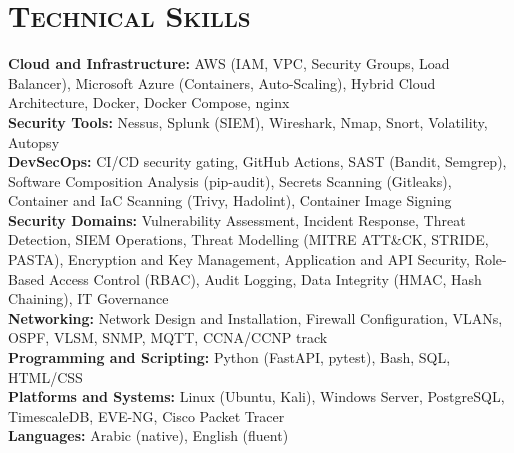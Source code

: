 \documentclass[10pt,letterpaper]{article}
\newenvironment{block}{\vspace{0.03em}\begingroup}{\endgroup\vspace{0.06em}}
\begin{document}
\section*{\textsc{Technical Skills}}
\begin{block}
\textbf{Cloud and Infrastructure:} AWS (IAM, VPC, Security Groups, Load Balancer), Microsoft Azure (Containers, Auto-Scaling), Hybrid Cloud Architecture, Docker, Docker Compose, nginx\\[0.1em]
\textbf{Security Tools:} Nessus, Splunk (SIEM), Wireshark, Nmap, Snort, Volatility, Autopsy\\[0.1em]
\textbf{DevSecOps:} CI/CD security gating, GitHub Actions, SAST (Bandit, Semgrep), Software Composition Analysis (pip-audit), Secrets Scanning (Gitleaks), Container and IaC Scanning (Trivy, Hadolint), Container Image Signing\\[0.1em]
\textbf{Security Domains:} Vulnerability Assessment, Incident Response, Threat Detection, SIEM Operations, Threat Modelling (MITRE ATT\&CK, STRIDE, PASTA), Encryption and Key Management, Application and API Security, Role-Based Access Control (RBAC), Audit Logging, Data Integrity (HMAC, Hash Chaining), IT Governance\\[0.1em]
\textbf{Networking:} Network Design and Installation, Firewall Configuration, VLANs, OSPF, VLSM, SNMP, MQTT, CCNA/CCNP track\\[0.1em]
\textbf{Programming and Scripting:} Python (FastAPI, pytest), Bash, SQL, HTML/CSS\\[0.1em]
\textbf{Platforms and Systems:} Linux (Ubuntu, Kali), Windows Server, PostgreSQL, TimescaleDB, EVE-NG, Cisco Packet Tracer\\[0.1em]
\textbf{Languages:} Arabic (native), English (fluent)
\end{block}

\end{document}
